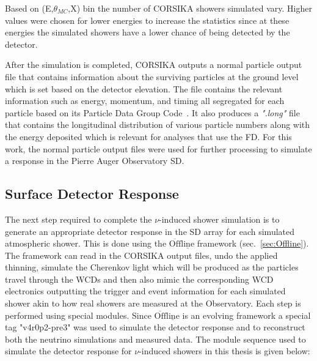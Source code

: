 Based on (E,$\theta_{MC}$,X) bin the number of CORSIKA showers simulated vary. Higher values were chosen for lower energies to increase the statistics since at these energies the simulated showers have a lower chance of being detected by the detector.  

After the simulation is completed, CORSIKA outputs a normal particle output file that contains information about the surviving particles at the ground level which is set based on the detector elevation. The file contains the relevant information such as energy, momentum, and timing all segregated for each particle based on its Particle Data Group Code~\cite{ParticleDataGroup:2024cfk}. It also produces a \textit{".long"} file that contains the longitudinal distribution of various particle numbers along with the energy deposited which is relevant for analyses that use the FD. For this work, the normal particle output files were used for further processing to simulate a response in the Pierre Auger Observatory SD.

\subsection{Surface Detector Response}
\label{subsec:sim_SD_resp}

The next step required to complete the $\nu$-induced shower simulation is to generate an appropriate detector response in the SD array for each simulated atmospheric shower. This is done using the $\mathrm{\overline{Off}\underline{line}}$ framework (sec.~\ref{sec:Offline}). The framework can read in the CORSIKA output files, undo the applied thinning, simulate the Cherenkov light which will be produced as the particles travel through the WCDs and then also mimic the corresponding WCD electronics outputting the trigger and event information for each simulated shower akin to how real showers are measured at the Observatory. Each step is performed using special modules. Since $\mathrm{\overline{Off}\underline{line}}$ is an evolving framework a special tag "v4r0p2-pre3" was used to simulate the detector response and to reconstruct both the neutrino simulations and measured data. The module sequence used to simulate the detector response for $\nu$-induced showers in this thesis is given below: 

